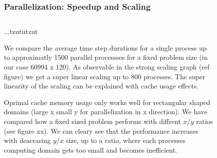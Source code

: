 \documentclass{beamer}
\begin{document}
%
%
%
\begin{frame}
\frametitle{Parallelization: Speedup and Scaling}
\begin{minipage}[1\textheight]{\textwidth}
\begin{columns}[T]
\begin{column}{0.5\textwidth}
\vspace{5mm}
\justify
...tzututzut


We compare the average time step durations for a single process up to approximatly 1500 parallel processses for a fixed problem size (in our case 60994 x 120). As observable in the strong scaling graph (ref figure) we get a super linear scaling up to 800 processes. 
The super linearity of the scaling can be explained with cache usage effects. \\
\vspace{2mm}

Oprimal cache memory usage only works well for rectangular shaped domains (large x small y for parallelization in x direction). We have compared how a fixed sized problem performs with diffrent $x/y$ ratios (see figure xx). We can cleary see that the performance increases with deacrasing $y/x$ size, up to a ratio, where each processes computing domain gets too small and becomes inefficient. \\



\end{column}
\begin{column}{0.5\textwidth}
\begin{figure}
\includegraphics[width=6cm]{speedup.pdf}
\caption{}
\end{figure}
\end{column}
\end{columns}
\end{minipage}
\end{frame}
%
%
%
\end{document}
